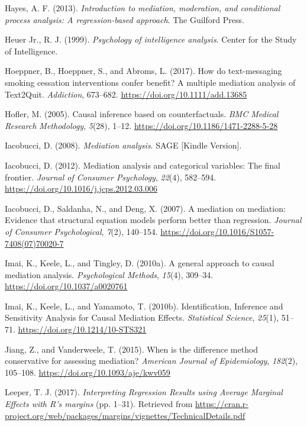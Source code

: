 \documentclass[]{DissertateUSU}
\begin{document}
\hypertarget{ref-Hayes2013book}{}
Hayes, A. F. (2013). \emph{Introduction to mediation, moderation, and
conditional process analysis: A regression-based approach}. The Guilford
Press.

\hypertarget{ref-intelbook1999}{}
Heuer Jr., R. J. (1999). \emph{Psychology of intelligence analysis}.
Center for the Study of Intelligence.

\hypertarget{ref-Hoeppner2017}{}
Hoeppner, B., Hoeppner, S., and Abroms, L. (2017). How do text-messaging
smoking cessation interventions confer benefit? A multiple mediation
analysis of Text2Quit. \emph{Addiction}, 673--682.
\url{https://doi.org/10.1111/add.13685}

\hypertarget{ref-Hofler2005}{}
Hofler, M. (2005). Causal inference based on counterfactuals. \emph{BMC
Medical Research Methodology}, \emph{5}(28), 1--12.
\url{https://doi.org/10.1186/1471-2288-5-28}

\hypertarget{ref-Iacobucci2008book}{}
Iacobucci, D. (2008). \emph{Mediation analysis}. SAGE {[}Kindle
Version{]}.

\hypertarget{ref-Iacobucci2012}{}
Iacobucci, D. (2012). Mediation analysis and categorical variables: The
final frontier. \emph{Journal of Consumer Psychology}, \emph{22}(4),
582--594. \url{https://doi.org/10.1016/j.jcps.2012.03.006}

\hypertarget{ref-Iacobucci2007}{}
Iacobucci, D., Saldanha, N., and Deng, X. (2007). A mediation on
mediation: Evidence that structural equation models perform better than
regression. \emph{Journal of Consumer Psychological}, \emph{7}(2),
140--154. \url{https://doi.org/10.1016/S1057-7408(07)70020-7}

\hypertarget{ref-Imai2010a}{}
Imai, K., Keele, L., and Tingley, D. (2010a). A general approach to
causal mediation analysis. \emph{Psychological Methods}, \emph{15}(4),
309--34. \url{https://doi.org/10.1037/a0020761}

\hypertarget{ref-Imai2010b}{}
Imai, K., Keele, L., and Yamamoto, T. (2010b). Identification, Inference
and Sensitivity Analysis for Causal Mediation Effects. \emph{Statistical
Science}, \emph{25}(1), 51--71. \url{https://doi.org/10.1214/10-STS321}

\hypertarget{ref-Jiang2015}{}
Jiang, Z., and Vanderweele, T. (2015). When is the difference method
conservative for assessing mediation? \emph{American Journal of
Epidemiology}, \emph{182}(2), 105--108.
\url{https://doi.org/10.1093/aje/kwv059}

\hypertarget{ref-Leeper2017}{}
Leeper, T. J. (2017). \emph{Interpreting Regression Results using
Average Marginal Effects with R's margins} (pp. 1--31). Retrieved from
\url{https://cran.r-project.org/web/packages/margins/vignettes/TechnicalDetails.pdf}
\end{document}
